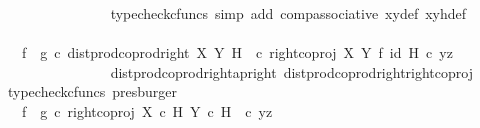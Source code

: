 \begin{isabellebody}
\ \ \ \ \ \ \ \ \ \ \ \ \ \ \isamarkupfalse%
\ {\isacharparenleft}{\kern0pt}typecheck{\isacharunderscore}{\kern0pt}cfuncs{\isacharcomma}{\kern0pt}\ simp\ add{\isacharcolon}{\kern0pt}\ comp{\isacharunderscore}{\kern0pt}associative{}\ xy{\isacharunderscore}{\kern0pt}def\ xyh{\isacharunderscore}{\kern0pt}def{\isacharparenright}{\kern0pt}\isanewline
\ \ \ \ \ \ \ \ \ \ \ \ \isamarkupfalse%
\ \isamarkupfalse%
\ {\isachardoublequoteopen}{\isachardot}{\kern0pt}{\isachardot}{\kern0pt}{\isachardot}{\kern0pt}\ {\isacharequal}{\kern0pt}\ {\isacharparenleft}{\kern0pt}f\isactrlsup {\isasymflat}\ {\isasymamalg}\ g\isactrlsup {\isasymflat}{\isacharparenright}{\kern0pt}\ {\isasymcirc}\isactrlsub c\ {\isacharparenleft}{\kern0pt}{\isacharparenleft}{\kern0pt}dist{\isacharunderscore}{\kern0pt}prod{\isacharunderscore}{\kern0pt}coprod{\isacharunderscore}{\kern0pt}right\ X\ Y\ H\ \ {\isasymcirc}\isactrlsub c\ {\isacharparenleft}{\kern0pt}right{\isacharunderscore}{\kern0pt}coproj\ X\ Y\ {\isasymtimes}\isactrlsub f\ id\ H{\isacharparenright}{\kern0pt}{\isacharparenright}{\kern0pt}\ {\isasymcirc}\isactrlsub c\ {\isasymlangle}y{\isacharcomma}{\kern0pt}z{\isasymrangle}{\isacharparenright}{\kern0pt}{\isachardoublequoteclose}\isanewline
\ \ \ \ \ \ \ \ \ \ \ \ \ \ \isamarkupfalse%
\ dist{\isacharunderscore}{\kern0pt}prod{\isacharunderscore}{\kern0pt}coprod{\isacharunderscore}{\kern0pt}right{\isacharunderscore}{\kern0pt}ap{\isacharunderscore}{\kern0pt}right\ dist{\isacharunderscore}{\kern0pt}prod{\isacharunderscore}{\kern0pt}coprod{\isacharunderscore}{\kern0pt}right{\isacharunderscore}{\kern0pt}right{\isacharunderscore}{\kern0pt}coproj\ \isamarkupfalse%
\ {\isacharparenleft}{\kern0pt}typecheck{\isacharunderscore}{\kern0pt}cfuncs{\isacharcomma}{\kern0pt}\ presburger{\isacharparenright}{\kern0pt}\isanewline
\ \ \ \ \ \ \ \ \ \ \ \ \isamarkupfalse%
\ \isamarkupfalse%
\ {\isachardoublequoteopen}{\isachardot}{\kern0pt}{\isachardot}{\kern0pt}{\isachardot}{\kern0pt}\ {\isacharequal}{\kern0pt}\ {\isacharparenleft}{\kern0pt}f\isactrlsup {\isasymflat}\ {\isasymamalg}\ g\isactrlsup {\isasymflat}{\isacharparenright}{\kern0pt}\ {\isasymcirc}\isactrlsub c\ {\isacharparenleft}{\kern0pt}right{\isacharunderscore}{\kern0pt}coproj\ {\isacharparenleft}{\kern0pt}X\ {\isasymtimes}\isactrlsub c\ H{\isacharparenright}{\kern0pt}\ {\isacharparenleft}{\kern0pt}Y\ {\isasymtimes}\isactrlsub c\ H{\isacharparenright}{\kern0pt}\ \ {\isasymcirc}\isactrlsub c\ {\isasymlangle}y{\isacharcomma}{\kern0pt}z{\isasymrangle}{\isacharparenright}{\kern0pt}{\isachardoublequoteclose}\isanewline

\end{isabellebody}
